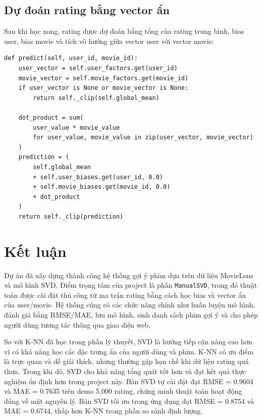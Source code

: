 \documentclass[12pt,a4paper]{article}
\begin{document}
\subsection{Dự đoán rating bằng vector ẩn}

Sau khi học xong, rating được dự đoán bằng tổng của rating trung bình, bias user, bias movie và tích vô hướng giữa vector user với vector movie:

\begin{lstlisting}[style=pythonstyle]
def predict(self, user_id, movie_id):
    user_vector = self.user_factors.get(user_id)
    movie_vector = self.movie_factors.get(movie_id)
    if user_vector is None or movie_vector is None:
        return self._clip(self.global_mean)

    dot_product = sum(
        user_value * movie_value
        for user_value, movie_value in zip(user_vector, movie_vector)
    )
    prediction = (
        self.global_mean
        + self.user_biases.get(user_id, 0.0)
        + self.movie_biases.get(movie_id, 0.0)
        + dot_product
    )
    return self._clip(prediction)
\end{lstlisting}

\section{Kết luận}

Dự án đã xây dựng thành công hệ thống gợi ý phim dựa trên dữ liệu MovieLens và mô hình SVD. Điểm trọng tâm của project là phần \texttt{ManualSVD}, trong đó thuật toán được cài đặt thủ công từ ma trận rating bằng cách học bias và vector ẩn của user/movie. Hệ thống cũng có các chức năng chính như huấn luyện mô hình, đánh giá bằng RMSE/MAE, lưu mô hình, sinh danh sách phim gợi ý và cho phép người dùng tương tác thông qua giao diện web.

So với K-NN đã học trong phần lý thuyết, SVD là hướng tiếp cận nâng cao hơn vì có khả năng học các đặc trưng ẩn của người dùng và phim. K-NN có ưu điểm là trực quan và dễ giải thích, nhưng thường gặp hạn chế khi dữ liệu rating quá thưa. Trong khi đó, SVD cho khả năng tổng quát tốt hơn và đạt kết quả thực nghiệm ổn định hơn trong project này. Bản SVD tự cài đặt đạt RMSE = 0.9604 và MAE = 0.7635 trên demo 5,000 rating, chứng minh thuật toán hoạt động đúng về mặt nguyên lý. Bản SVD tối ưu trong ứng dụng đạt RMSE = 0.8754 và MAE = 0.6744, thấp hơn K-NN trong phần so sánh định lượng.
\end{document}

